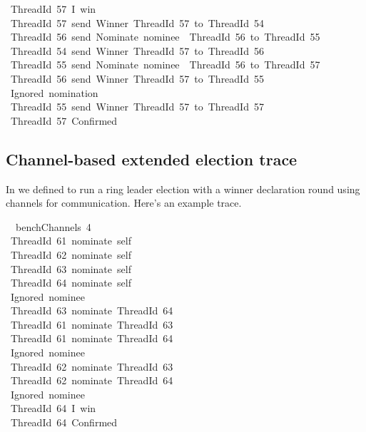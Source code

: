 \documentclass[sigplan,screen]{acmart}
\begin{document}
\begin{tabbing}
\ttfamily ~ThreadId~57~I~win\\
\ttfamily ~ThreadId~57~send~Winner~ThreadId~57~to~ThreadId~54\\
\ttfamily ~ThreadId~56~send~Nominate~nominee~~ThreadId~56~to~ThreadId~55\\
\ttfamily ~ThreadId~54~send~Winner~ThreadId~57~to~ThreadId~56\\
\ttfamily ~ThreadId~55~send~Nominate~nominee~~ThreadId~56~to~ThreadId~57\\
\ttfamily ~ThreadId~56~send~Winner~ThreadId~57~to~ThreadId~55\\
\ttfamily ~Ignored~nomination\\
\ttfamily ~ThreadId~55~send~Winner~ThreadId~57~to~ThreadId~57\\
\ttfamily ~ThreadId~57~Confirmed
\end{tabbing}

\normalsize







\subsection{Channel-based extended election trace}
\label{apx:benchChannels-trace}

In  we defined  to run a ring
leader election with a winner declaration round using channels for
communication.
%
Here's an example trace.

\scriptsize

\begin{tabbing}\ttfamily
~~benchChannels~4\\
\ttfamily ~ThreadId~61~nominate~self\\
\ttfamily ~ThreadId~62~nominate~self\\
\ttfamily ~ThreadId~63~nominate~self\\
\ttfamily ~ThreadId~64~nominate~self\\
\ttfamily ~Ignored~nominee\\
\ttfamily ~ThreadId~63~nominate~ThreadId~64\\
\ttfamily ~ThreadId~61~nominate~ThreadId~63\\
\ttfamily ~ThreadId~61~nominate~ThreadId~64\\
\ttfamily ~Ignored~nominee\\
\ttfamily ~ThreadId~62~nominate~ThreadId~63\\
\ttfamily ~ThreadId~62~nominate~ThreadId~64\\
\ttfamily ~Ignored~nominee\\
\ttfamily ~ThreadId~64~I~win\\
\ttfamily ~ThreadId~64~Confirmed
\end{tabbing}
\end{document}
